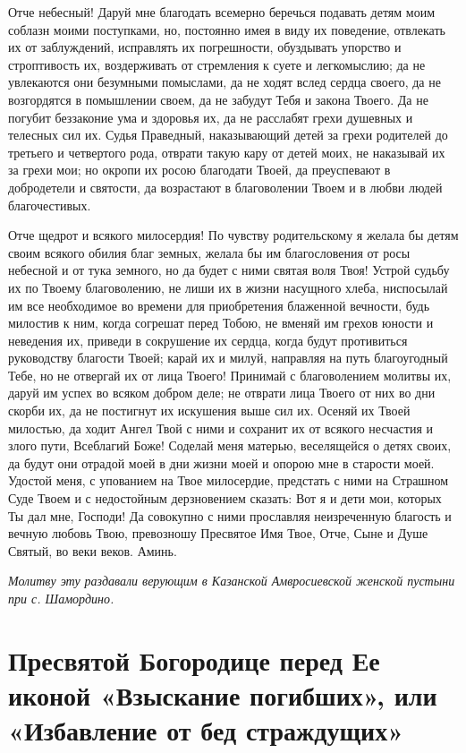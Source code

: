 Отче небесный! Даруй мне благодать всемерно беречься подавать детям моим соблазн моими поступками, но, постоянно имея в виду их поведение, отвлекать их от заблуждений, исправлять их погрешности, обуздывать упорство и строптивость их, воздерживать от стремления к суете и легкомыслию; да не увлекаются они безумными помыслами, да не ходят вслед сердца своего, да не возгордятся в помышлении своем, да не забудут Тебя и закона Твоего. Да не погубит беззаконие ума и здоровья их, да не расслабят грехи душевных и телесных сил их. Судья Праведный, наказывающий детей за грехи родителей до третьего и четвертого рода, отврати такую кару от детей моих, не наказывай их за грехи мои; но окропи их росою благодати Твоей, да преуспевают в добродетели и святости, да возрастают в благоволении Твоем и в любви людей благочестивых.


Отче щедрот и всякого милосердия! По чувству родительскому я желала бы детям своим всякого обилия благ земных, желала бы им благословения от росы небесной и от тука земного, но да будет с ними святая воля Твоя! Устрой судьбу их по Твоему благоволению, не лиши их в жизни насущного хлеба, ниспосылай им все необходимое во времени для приобретения блаженной вечности, будь милостив к ним, когда согрешат перед Тобою, не вменяй им грехов юности и неведения их, приведи в сокрушение их сердца, когда будут противиться руководству благости Твоей; карай их и милуй, направляя на путь благоугодный Тебе, но не отвергай их от лица Твоего! Принимай с благоволением молитвы их, даруй им успех во всяком добром деле; не отврати лица Твоего от них во дни скорби их, да не постигнут их искушения выше сил их. Осеняй их Твоей милостью, да ходит Ангел Твой с ними и сохранит их от всякого несчастия и злого пути, Всеблагий Боже! Соделай меня матерью, веселящейся о детях своих, да будут они отрадой моей в дни жизни моей и опорою мне в старости моей. Удостой меня, с упованием на Твое милосердие, предстать с ними на Страшном Суде Твоем и с недостойным дерзновением сказать: Вот я и дети мои, которых Ты дал мне, Господи! Да совокупно с ними прославляя неизреченную благость и вечную любовь Твою, превозношу Пресвятое Имя Твое, Отче, Сыне и Душе Святый, во веки веков. Аминь.

\itshape Молитву эту раздавали верующим в Казанской Амвросиевской женской пустыни при с. Шамордино.

\normalfont{}





\section{Пресвятой Богородице перед Ее иконой «Взыскание погибших», или «Избавление от бед страждущих»}
 
